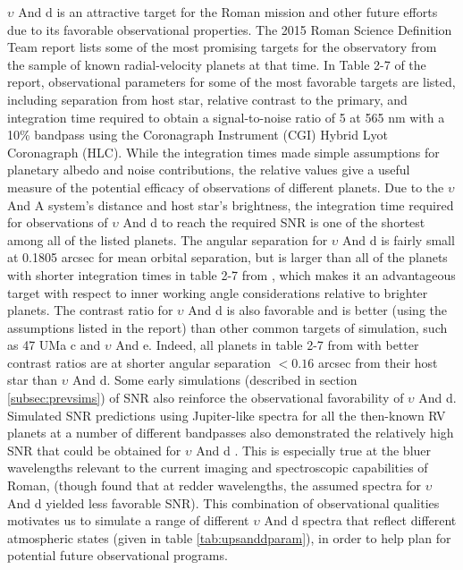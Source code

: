 \documentclass[12pt, letterpaper]{aastex631}
\begin{document}
$\upsilon$ And d is an attractive target for the Roman mission and other future efforts due to its favorable observational properties. The 2015 Roman Science Definition Team report \citep{2015arXiv150303757S} lists some of the most promising targets for the observatory from the sample of known
radial-velocity planets at that time.  In Table 2-7 of the report, observational parameters for some of the most favorable targets are listed, including separation from host star, relative contrast to the primary, and integration time required to obtain a signal-to-noise ratio of 5 at 565 nm with a 10\% bandpass using the Coronagraph Instrument (CGI) Hybrid Lyot Coronagraph (HLC).  While the integration times made simple assumptions for planetary albedo and noise contributions, the relative values give a useful measure of the potential efficacy of observations of different planets.  Due to the $\upsilon$ And A system's distance and host star's brightness, the integration time required for observations of $\upsilon$ And d to reach the required SNR is one of the shortest among all of the listed planets.  The angular separation for $\upsilon$ And d is fairly small at 0.1805 arcsec for mean orbital separation, but is larger than all of the planets with shorter integration times in table 2-7 from \textcite{2015arXiv150303757S}, which makes it an advantageous target with respect to inner working angle considerations relative to brighter planets. The contrast ratio for $\upsilon$ And d is also favorable and is better (using the assumptions listed in the report) than other common targets of simulation, such as 47 UMa c and $\upsilon$ And e.  Indeed, all planets in table 2-7 from \textcite{2015arXiv150303757S} with better contrast ratios are at shorter angular separation $<0.16$ arcsec from their host star than $\upsilon$ And d.  Some early simulations (described in section \ref{subsec:prevsims}) of SNR also reinforce the observational favorability of $\upsilon$ And d. Simulated SNR predictions using Jupiter-like spectra for all the then-known RV planets at a number of different bandpasses also demonstrated the relatively high SNR that could be obtained for $\upsilon$ And d \citep{2019AJ....157..132L}.  This is especially true at the bluer wavelengths relevant to the current imaging and spectroscopic capabilities of Roman, (though \textcite{2019AJ....157..132L} found that at redder wavelengths, the assumed spectra for $\upsilon$ And d yielded less favorable SNR).  This combination of observational qualities motivates us to simulate a range of different $\upsilon$ And d spectra that reflect different atmospheric states (given in table \ref{tab:upsanddparam}), in order to help plan for potential future observational programs. 
\end{document}
